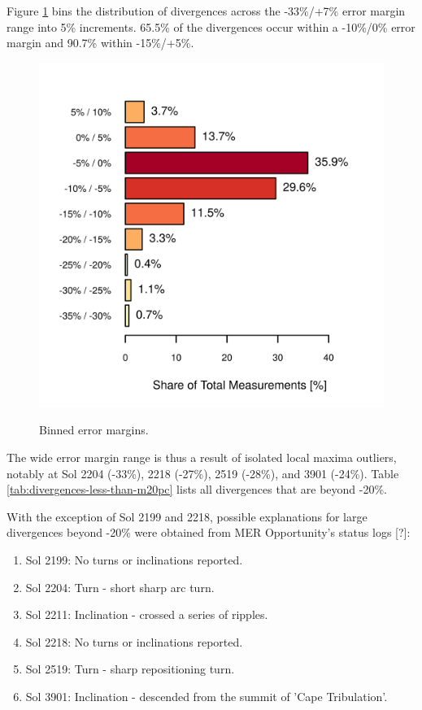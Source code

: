 \clearpage

Figure \ref{fig:plot:binned-error-margins} bins the distribution of divergences across the -33\%/+7\% error margin range into 5\% increments. 65.5\% of the divergences occur within a -10\%/0\% error margin and 90.7\%  within -15\%/+5\%.

\begin{figure}[h]
  \centering
  \hypersetup{linkcolor=captionTextColor}
  \includegraphics[width=0.5\linewidth]{sections/mars-solar-energy/photovoltaic-energy/plots/binned-error-margins.png}\\
  \caption[Binned error margins]
          {Binned error margins.}
  \label{fig:plot:binned-error-margins}
\end{figure}

The wide error margin range is thus a result of isolated local maxima outliers, notably at Sol 2204 (-33\%), 2218 (-27\%), 2519 (-28\%), and 3901 (-24\%). Table \ref{tab:divergences-less-than-m20pc} lists all divergences that are beyond -20\%.



With the exception of Sol 2199 and 2218, possible explanations for large divergences beyond -20\% were obtained from MER Opportunity's status logs [?]:

\begin{enumerate}[label=\textbf{\textcolor{BulletBlue}{(\alph*)}}]
  \item Sol 2199: No turns or inclinations reported.
  \item Sol 2204: Turn - short sharp arc turn.
  \item Sol 2211: Inclination - crossed a series of ripples.
  \item Sol 2218: No turns or inclinations reported.
  \item Sol 2519: Turn - sharp repositioning turn.
  \item Sol 3901: Inclination - descended from the summit of 'Cape Tribulation'.
\end{enumerate}

